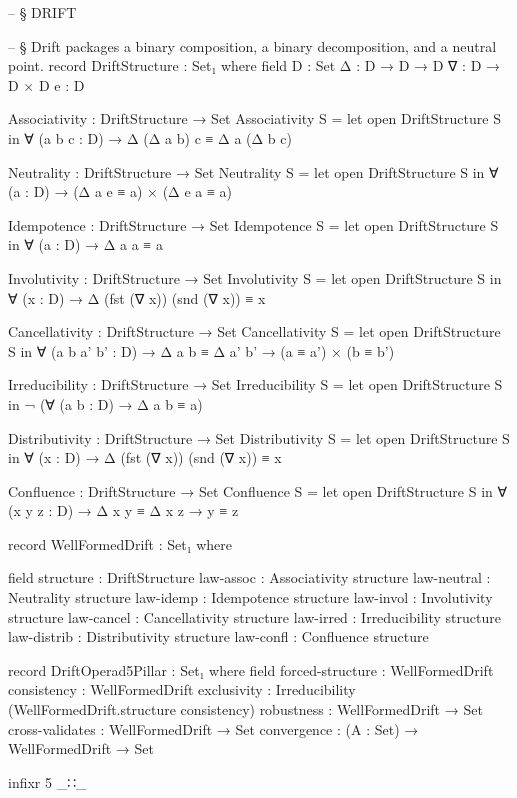 \documentclass[11pt,a4paper]{book}
\begin{document}
\begin{code}


-- § DRIFT

-- § Drift packages a binary composition, a binary decomposition, and a neutral point.
record DriftStructure : Set₁ where
  field
    D : Set
    Δ : D → D → D
    ∇ : D → D × D
    e : D

Associativity : DriftStructure → Set
Associativity S = let open DriftStructure S in
  ∀ (a b c : D) → Δ (Δ a b) c ≡ Δ a (Δ b c)

Neutrality : DriftStructure → Set
Neutrality S = let open DriftStructure S in
  ∀ (a : D) → (Δ a e ≡ a) × (Δ e a ≡ a)

Idempotence : DriftStructure → Set
Idempotence S = let open DriftStructure S in
  ∀ (a : D) → Δ a a ≡ a

Involutivity : DriftStructure → Set
Involutivity S = let open DriftStructure S in
  ∀ (x : D) → Δ (fst (∇ x)) (snd (∇ x)) ≡ x

Cancellativity : DriftStructure → Set
Cancellativity S = let open DriftStructure S in
  ∀ (a b a' b' : D) → Δ a b ≡ Δ a' b' → (a ≡ a') × (b ≡ b')

Irreducibility : DriftStructure → Set
Irreducibility S = let open DriftStructure S in
  ¬ (∀ (a b : D) → Δ a b ≡ a)

Distributivity : DriftStructure → Set
Distributivity S = let open DriftStructure S in
  ∀ (x : D) → Δ (fst (∇ x)) (snd (∇ x)) ≡ x

Confluence : DriftStructure → Set
Confluence S = let open DriftStructure S in
  ∀ (x y z : D) → Δ x y ≡ Δ x z → y ≡ z

record WellFormedDrift : Set₁ where

  field
    structure : DriftStructure
    law-assoc    : Associativity structure
    law-neutral  : Neutrality structure
    law-idemp    : Idempotence structure
    law-invol    : Involutivity structure
    law-cancel   : Cancellativity structure
    law-irred    : Irreducibility structure
    law-distrib  : Distributivity structure
    law-confl    : Confluence structure

record DriftOperad5Pillar : Set₁ where
  field
    forced-structure : WellFormedDrift
    consistency      : WellFormedDrift
    exclusivity      : Irreducibility (WellFormedDrift.structure consistency)
    robustness       : WellFormedDrift → Set
    cross-validates  : WellFormedDrift → Set
    convergence      : (A : Set) → WellFormedDrift → Set

infixr 5 _∷_

\end{code}
\end{document}
